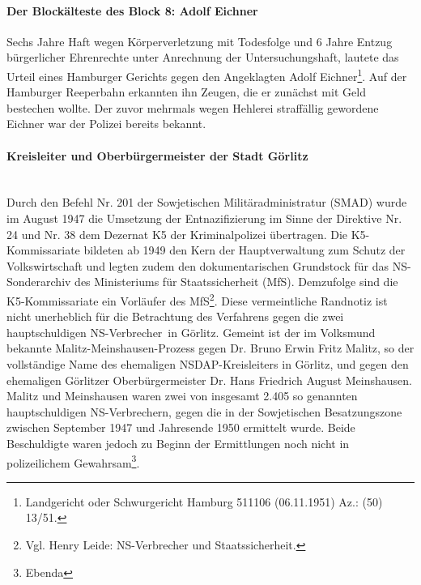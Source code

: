 \documentclass[a4paper,12pt,ngerman,
]{nisebook}
\begin{document}
\paragraph{Der Blockälteste des Block 8: Adolf Eichner\label{eichner_ahndung}}
\glqq Sechs Jahre Haft wegen Körperverletzung mit Todesfolge und 6 Jahre Entzug bürgerlicher Ehrenrechte unter Anrechnung der Untersuchungshaft\grqq, lautete das Urteil eines Hamburger Gerichts gegen den Angeklagten Adolf Eichner\footnote{Landgericht oder Schwurgericht Hamburg 511106 (06.11.1951) Az.: (50) 13/51.}. Auf der Hamburger Reeperbahn erkannten ihn Zeugen, die er zunächst mit Geld bestechen wollte. Der zuvor mehrmals wegen Hehlerei straffällig gewordene Eichner war der Polizei bereits bekannt.


\paragraph{Kreisleiter und Oberbürgermeister der Stadt Görlitz}~\\
Durch den Befehl Nr. 201 der Sowjetischen Militäradministratur (SMAD) wurde im August 1947 die Umsetzung der Entnazifizierung im Sinne der Direktive Nr. 24 und Nr. 38 dem Dezernat K5 der Kriminalpolizei übertragen. Die K5-Kommissariate bildeten ab 1949 den Kern der Hauptverwaltung zum Schutz der Volkswirtschaft und legten zudem den dokumentarischen Grundstock für das NS-Sonderarchiv des Ministeriums für Staatssicherheit (MfS). Demzufolge sind die K5-Kommissariate ein Vorläufer des MfS\footnote{Vgl. Henry Leide: NS-Verbrecher und Staatssicherheit.}. Diese vermeintliche Randnotiz ist nicht unerheblich für die Betrachtung des Verfahrens gegen die zwei \glqq hauptschuldigen NS-Verbrecher\grqq~in Görlitz. Gemeint ist der im Volksmund bekannte Malitz-Meinshausen-Prozess gegen Dr. Bruno Erwin Fritz Malitz, so der vollständige Name des ehemaligen NSDAP-Kreisleiters in Görlitz, und gegen den ehemaligen Görlitzer Oberbürgermeister Dr. Hans Friedrich August Meinshausen. Malitz und Meinshausen waren zwei von insgesamt 2.405 so genannten hauptschuldigen NS-Verbrechern, gegen die in der Sowjetischen Besatzungszone zwischen September 1947 und Jahresende 1950 ermittelt wurde. Beide Beschuldigte waren jedoch zu Beginn der Ermittlungen noch nicht in polizeilichem Gewahrsam\footnote{Ebenda}.
\end{document}
